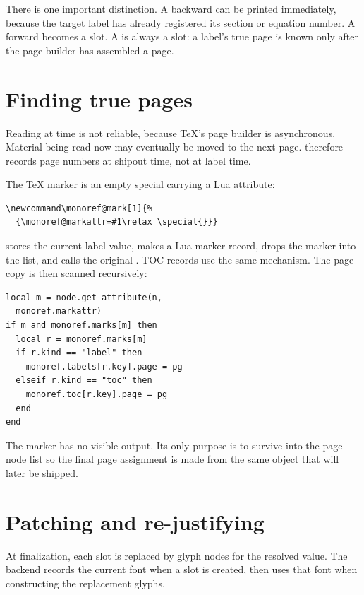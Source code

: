 \documentclass{ltugboat}
\begin{document}
There is one important distinction.  A backward  can be printed
immediately, because the target label has already registered its
section or equation number.  A forward  becomes a slot.  A
 is always a slot: a label's true page is known only after
the page builder has assembled a page.

\section{Finding true pages}

Reading  at  time is not reliable,
because \TeX{}'s page builder is asynchronous.  Material being read now
may eventually be moved to the next page.   therefore
records page numbers at shipout time, not at label time.

The TeX marker is an empty special carrying a Lua attribute:
\begin{lstlisting}[style=monoreftex]
\newcommand\monoref@mark[1]{%
  {\monoref@markattr=#1\relax \special{}}}
\end{lstlisting}
 stores the current label value, makes a Lua marker record,
drops the marker into the list, and calls the original .
TOC records use the same mechanism.  The page copy is then scanned
recursively:
\begin{lstlisting}[style=monoreflua]
local m = node.get_attribute(n,
  monoref.markattr)
if m and monoref.marks[m] then
  local r = monoref.marks[m]
  if r.kind == "label" then
    monoref.labels[r.key].page = pg
  elseif r.kind == "toc" then
    monoref.toc[r.key].page = pg
  end
end
\end{lstlisting}
The marker has no visible output.  Its only purpose is to survive into
the page node list so the final page assignment is made from the same
object that will later be shipped.

\section{Patching and re-justifying}

At finalization, each slot is replaced by glyph nodes for the resolved
value.  The backend records the current font when a slot is created,
then uses that font when constructing the replacement glyphs.
\end{document}
